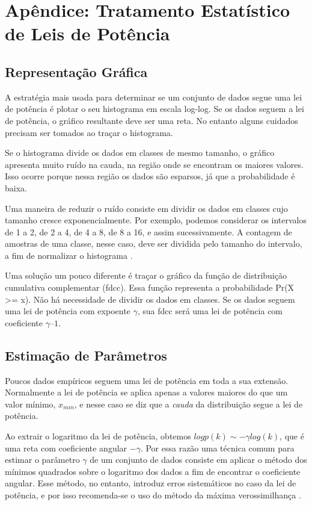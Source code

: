 \documentclass{article}
\begin{document}
\section{Apêndice: Tratamento Estatístico de Leis de Potência} \label{sec:estatistica}

\subsection{Representação Gráfica}

A estratégia mais usada para determinar se um conjunto de dados segue uma lei de potência é plotar o seu histograma em escala log-log. Se os dados seguem a lei de potência, o gráfico resultante deve ser uma reta. No entanto alguns cuidados precisam ser tomados ao traçar o histograma.

Se o histograma divide os dados em classes de mesmo tamanho, o gráfico apresenta muito ruído na cauda, na região onde se encontram os maiores valores. Isso ocorre porque nessa região os dados são esparsos, já que a probabilidade é baixa. 

Uma maneira de reduzir o ruído consiste em dividir os dados em classes cujo tamanho cresce exponencialmente. Por exemplo, podemos considerar os intervalos de 1 a 2, de 2 a 4, de 4 a 8, de 8 a 16, e assim sucessivamente. A contagem de amostras de uma classe, nesse caso, deve ser dividida pelo tamanho do intervalo, a fim de normalizar o histograma \cite{Newman2005}.

Uma solução um pouco diferente é traçar o gráfico da função de distribuição cumulativa complementar (fdcc). Essa função representa a probabilidade Pr(X >= x). Não há necessidade de dividir os dados em classes. Se os dados seguem uma lei de potência com expoente $\gamma$, sua fdcc será uma lei de potência com coeficiente $\gamma – 1$.


\subsection{Estimação de Parâmetros}

Poucos dados empíricos seguem uma lei de potência em toda a sua extensão. Normalmente a lei de potência se aplica apenas a valores maiores do que um valor mínimo, $x_{min}$, e nesse caso se diz que a \emph{cauda} da distribuição segue a lei de potência.

Ao extrair o logaritmo da lei de potência, obtemos $log p(k) \sim -\gamma log(k)$, que é uma reta com coeficiente angular $-\gamma$. Por essa razão uma técnica comum para estimar o parâmetro $\gamma$ de um conjunto de dados consiste em aplicar o método dos mínimos quadrados sobre o logaritmo dos dados a fim de encontrar o coeficiente angular. Esse método, no entanto, introduz erros sistemáticos no caso da lei de potência, e por isso recomenda-se o uso do método da máxima verossimilhança \cite{Clauset2007}.
\end{document}

